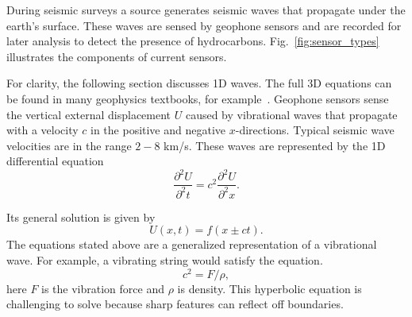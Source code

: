 During seismic surveys a source generates seismic waves that propagate under the earth's surface. 
These waves are sensed by geophone sensors and are recorded for later analysis to detect the presence of hydrocarbons. 
Fig.~\ref{fig:sensor_types} illustrates the components of current sensors. 

For clarity, the following section discusses 1D waves.  The full 3D equations can be found in many geophysics textbooks, for example~\cite{shearer2009introduction}.
Geophone sensors sense the vertical external displacement $U$ caused by vibrational waves that propagate with a velocity $c$ in the positive and negative $x$-directions. 
Typical seismic wave velocities are in the range $2-8$ km/s.
These waves are represented by the 1D differential equation
\begin{equation}
\frac{\partial^{2}{U}}{\partial^{2}{t}} = {c}^{2}\frac{\partial^{2}{U}}{\partial^{2}{x}}.
\end{equation}

Its general solution is given by
\begin{equation}
U(x,t) = f(x \pm c t).
\end{equation}
The equations stated above are a generalized representation of a vibrational wave. For example, a vibrating string would satisfy the equation. 
\begin{equation}
{c}^{2} = F/\rho,
\end{equation}
here $F$ is the vibration force and $\rho$ is density.
This hyperbolic equation is challenging to solve because sharp features can reflect off boundaries.


